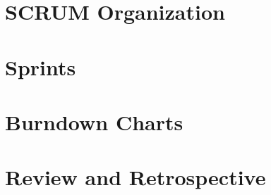 
\section{SCRUM Organization}

\section{Sprints}

\section{Burndown Charts}

\section{Review and Retrospective}






